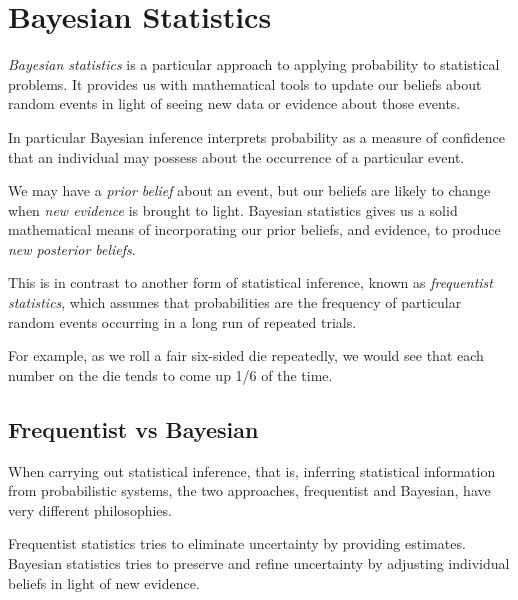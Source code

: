 \chapter{Bayesian Statistics}
\label{cap:bayes}

\emph{Bayesian statistics} is a particular approach to applying probability to statistical problems. It provides us with mathematical tools to update our beliefs about random events in light of seeing new data or evidence about those events.

In particular Bayesian inference interprets probability as a measure of confidence that an individual may possess about the occurrence of a particular event.

We may have a \emph{prior belief} about an event, but our beliefs are likely to change when \emph{new evidence} is brought to light. Bayesian statistics gives us a solid mathematical means of incorporating our prior beliefs, and evidence, to produce \emph{new posterior beliefs}.

This is in contrast to another form of statistical inference, known as \emph{frequentist statistics}, which assumes that probabilities are the frequency of particular random events occurring in a long run of repeated trials.

For example, as we roll a fair six-sided die repeatedly, we would see that each number on the die tends to come up 1/6 of the time.

\section{Frequentist vs Bayesian}
When carrying out statistical inference, that is, inferring statistical information from probabilistic systems, the two approaches, frequentist and Bayesian, have very different philosophies.

Frequentist statistics tries to eliminate uncertainty by providing estimates. Bayesian statistics tries to preserve and refine uncertainty by adjusting individual beliefs in light of new evidence.

